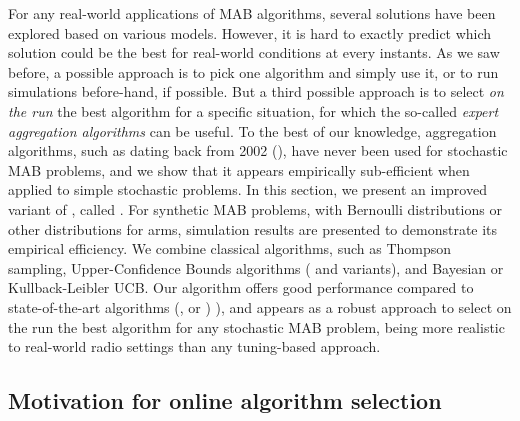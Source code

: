 
For any real-world applications of MAB algorithms, several solutions have been explored based on various models.
However, it is hard to exactly predict which solution could be the best for real-world conditions at every instants.
As we saw before, a possible approach is to pick one algorithm and simply use it, or to run simulations before-hand, if possible.
But a third possible approach is to select \emph{on the run} the best algorithm for a specific situation, for which the so-called \emph{expert aggregation algorithms} can be useful.
%
To the best of our knowledge, aggregation algorithms, such as \ExpQ{} dating back from 2002 (\cite{Auer02}),
have never been used for stochastic MAB problems,
and we show that it appears empirically sub-efficient when applied to simple stochastic problems.
%
In this section, we present an improved variant of \ExpQ, called \Aggr.
For synthetic MAB problems,
with Bernoulli distributions or other distributions for arms,
simulation results are presented to demonstrate its empirical efficiency.
We combine classical algorithms, such as Thompson sampling, Upper-Confidence Bounds algorithms (\UCB{} and variants), and Bayesian or Kullback-Leibler UCB.
%
Our algorithm offers good performance compared to state-of-the-art algorithms
(\ExpQ{}, \CORRAL{} or \LearnExp{}) \cite{Agarwal16,Singla17}),
and appears as a robust approach to select on the run the best algorithm for any stochastic MAB problem, being more realistic to real-world radio settings than any tuning-based approach.



\subsection{Motivation for online algorithm selection}\label{sub:25:introduction}

